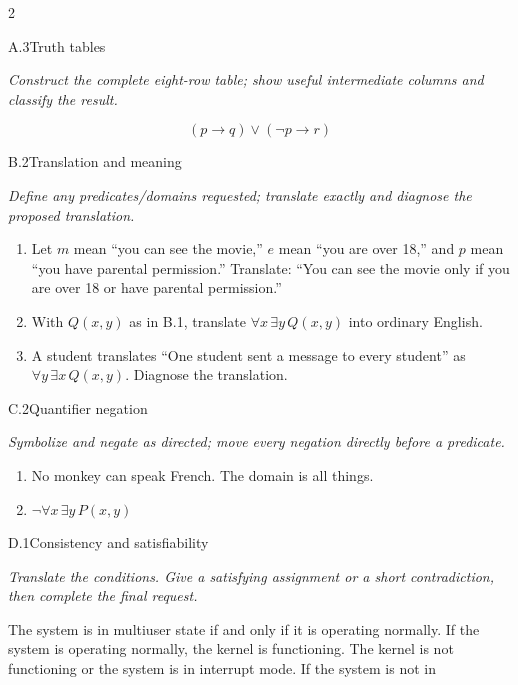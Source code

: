\documentclass[9pt]{extarticle}
\begin{document}
\CoreWorkArea
\FormBreak
{}
\begin{multicols}{2}
\begin{CoreProblem}{A.3}{Truth tables}
{\scriptsize\textit{Construct the complete eight-row table; show useful intermediate columns and classify the result.}\par}
\[
  (p\to q)\lor(\neg p\to r)
\]
\end{CoreProblem}
\begin{CoreProblem}{B.2}{Translation and meaning}
{\scriptsize\textit{Define any predicates/domains requested; translate exactly and diagnose the proposed translation.}\par}
\begin{enumerate}[label=(\alph*)]
  \item Let $m$ mean ``you can see the movie,'' $e$ mean ``you are over 18,''
        and $p$ mean ``you have parental permission.'' Translate: ``You can
        see the movie only if you are over 18 or have parental permission.''
  \item With $Q(x,y)$ as in B.1, translate $\forall x\,\exists y\,Q(x,y)$
        into ordinary English.
  \item A student translates ``One student sent a message to every student''
        as $\forall y\,\exists x\,Q(x,y)$. Diagnose the translation.
\end{enumerate}
\end{CoreProblem}
\begin{CoreProblem}{C.2}{Quantifier negation}
{\scriptsize\textit{Symbolize and negate as directed; move every negation directly before a predicate.}\par}
\begin{enumerate}[label=(\alph*)]
  \item No monkey can speak French. The domain is all things.
  \item $\neg\forall x\,\exists y\,P(x,y)$
\end{enumerate}
\end{CoreProblem}
\columnbreak
\begin{CoreProblem}{D.1}{Consistency and satisfiability}
{\scriptsize\textit{Translate the conditions. Give a satisfying assignment or a short contradiction, then complete the final request.}\par}
The system is in multiuser state if and only if it is operating normally. If
the system is operating normally, the kernel is functioning. The kernel is not
functioning or the system is in interrupt mode. If the system is not in

\end{CoreProblem}
\end{multicols}
\end{document}

